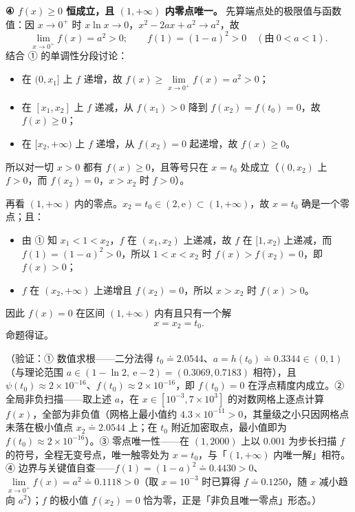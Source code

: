 \begin{answer}
\textbf{④ \(f(x)\geqslant0\) 恒成立，且 \((1,+\infty)\) 内零点唯一。} 先算端点处的极限值与函数值：因 \(x\to0^{+}\) 时 \(x\ln x\to0\)，\(x^{2}-2ax+a^{2}\to a^{2}\)，故
\nopagebreak[4]
\[
\lim_{x\to0^{+}}f(x)=a^{2}>0;\qquad f(1)=(1-a)^{2}>0\quad(\text{由}\ 0<a<1).
\]
结合 ① 的单调性分段讨论：

\begin{itemize}
\item 在 \((0,x_{1}]\) 上 \(f\) 递增，故 \(f(x)\geqslant\lim\limits_{x\to0^{+}}f(x)=a^{2}>0\)；
\item 在 \([x_{1},x_{2}]\) 上 \(f\) 递减，从 \(f(x_{1})>0\) 降到 \(f(x_{2})=f(t_{0})=0\)，故 \(f(x)\geqslant0\)；
\item 在 \([x_{2},+\infty)\) 上 \(f\) 递增，从 \(f(x_{2})=0\) 起递增，故 \(f(x)\geqslant0\)。
\end{itemize}

所以对一切 \(x>0\) 都有 \(f(x)\geqslant0\)，且等号只在 \(x=t_{0}\) 处成立（\((0,x_{2})\) 上 \(f>0\)，而 \(f(x_{2})=0\)，\(x>x_{2}\) 时 \(f>0\)）。

再看 \((1,+\infty)\) 内的零点。\(x_{2}=t_{0}\in(2,\mathrm{e})\subset(1,+\infty)\)，故 \(x=t_{0}\) 确是一个零点；且：

\begin{itemize}
\item 由 ① 知 \(x_{1}<1<x_{2}\)，\(f\) 在 \((x_{1},x_{2})\) 上递减，故 \(f\) 在 \([1,x_{2})\) 上递减，而 \(f(1)=(1-a)^{2}>0\)，所以 \(1<x<x_{2}\) 时 \(f(x)>f(x_{2})=0\)，即 \(f(x)>0\)；
\item \(f\) 在 \((x_{2},+\infty)\) 上递增且 \(f(x_{2})=0\)，所以 \(x>x_{2}\) 时 \(f(x)>0\)。
\end{itemize}

因此 \(f(x)=0\) 在区间 \((1,+\infty)\) 内有且只有一个解
\nopagebreak[4]
\[
x=x_{2}=t_{0}.
\]
命题得证。

（验证：① 数值求根——二分法得 \(t_{0}\doteq2.0544\)、\(a=h(t_{0})\doteq0.3344\in(0,1)\)（与理论范围 \(a\in(1-\ln2,\ \mathrm{e}-2)=(0.3069,0.7183)\) 相符），且 \(\psi(t_{0})\approx2\times10^{-16}\)、\(f(t_{0})\approx2\times10^{-16}\)，即 \(f(t_{0})=0\) 在浮点精度内成立。② 全局非负扫描——取上述 \(a\)，在 \(x\in[10^{-3},7\times10^{3}]\) 的对数网格上逐点计算 \(f(x)\)，全部为非负值（网格上最小值约 \(4.3\times10^{-11}>0\)，其量级之小只因网格点未落在极小值点 \(x_{2}\doteq2.0544\) 上；在 \(t_{0}\) 附近加密取点，最小值即为 \(f(t_{0})\approx2\times10^{-16}\)）。③ 零点唯一性——在 \((1,2000)\) 上以 \(0.001\) 为步长扫描 \(f\) 的符号，全程无变号点，唯一触零处为 \(x=t_{0}\)，与「\((1,+\infty)\) 内唯一解」相符。④ 边界与关键值自查——\(f(1)=(1-a)^{2}\doteq0.4430>0\)、\(\lim\limits_{x\to0^{+}}f(x)=a^{2}\doteq0.1118>0\)（取 \(x=10^{-3}\) 时已算得 \(f\doteq0.1250\)，随 \(x\) 减小趋向 \(a^{2}\)）；\(f\) 的极小值 \(f(x_{2})=0\) 恰为零，正是「非负且唯一零点」形态。）



\end{answer}